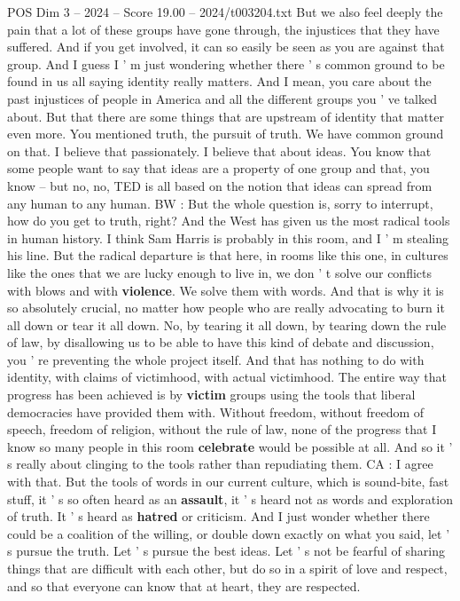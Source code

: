 \begin{textsample}{POS Dim 3 – 2024 – Score 19.00 – 2024/t003204.txt}
But we also feel deeply the pain that a lot of these groups have gone through, the injustices that they have suffered.
And if you get involved, it can so easily be seen as you are against that group.
And I guess I ' m just wondering whether there ' s common ground to be found in us all saying identity really matters.
And I mean, you care about the past injustices of people in America and all the different groups you ' ve talked about.
But that there are some things that are upstream of identity that matter even more.
You mentioned truth, the pursuit of truth.
We have common ground on that.
I believe that passionately.
I believe that about ideas.
You know that some people want to say that ideas are a property of one group and that, you know -- but no, no, TED is all based on the notion that ideas can spread from any human to any human.
BW : But the whole question is, sorry to interrupt, how do you get to truth, right?
And the West has given us the most radical tools in human history.
I think Sam Harris is probably in this room, and I ' m stealing his line.
But the radical departure is that here, in rooms like this one, in cultures like the ones that we are lucky enough to live in, we don ' t solve our conflicts with blows and with \textbf{violence}.
We solve them with words.
And that is why it is so absolutely crucial, no matter how people who are really advocating to burn it all down or tear it all down.
No, by tearing it all down, by tearing down the rule of law, by disallowing us to be able to have this kind of debate and discussion, you ' re preventing the whole project itself.
And that has nothing to do with identity, with claims of victimhood, with actual victimhood.
The entire way that progress has been achieved is by \textbf{victim} groups using the tools that liberal democracies have provided them with.
Without freedom, without freedom of speech, freedom of religion, without the rule of law, none of the progress that I know so many people in this room \textbf{celebrate} would be possible at all.
And so it ' s really about clinging to the tools rather than repudiating them.
CA : I agree with that.
But the tools of words in our current culture, which is sound-bite, fast stuff, it ' s so often heard as an \textbf{assault}, it ' s heard not as words and exploration of truth.
It ' s heard as \textbf{hatred} or criticism.
And I just wonder whether there could be a coalition of the willing, or double down exactly on what you said, let ' s pursue the truth.
Let ' s pursue the best ideas.
Let ' s not be fearful of sharing things that are difficult with each other, but do so in a spirit of love and respect, and so that everyone can know that at heart, they are respected.

\end{textsample}
